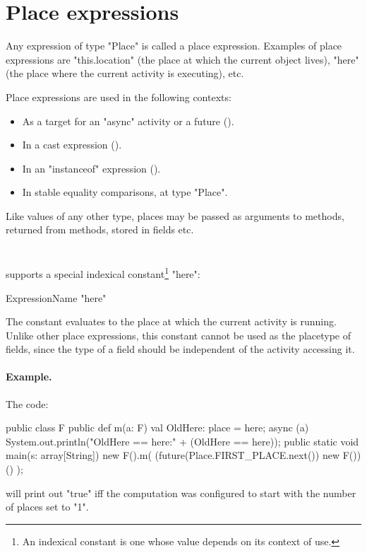 \section{Place expressions}
Any expression of type \xcd"Place" is called a place expression. 
Examples of place expressions are \xcd"this.location" (the place
at which the current object lives), \xcd"here"
(the place where the current activity is executing), etc.

Place expressions are used in the following contexts: 
\begin{itemize}
\item As a target for an \xcd"async" activity or a future
().
\item In a cast expression ().
\item In an \xcd"instanceof" expression ().
\item In stable equality comparisons, at type \xcd"Place".
\end{itemize}

Like values of any other type, places may be passed as arguments
to methods, returned from methods, stored in fields etc.

\section{}\label{Here}
\Xten{} supports a special indexical constant\footnote{
An indexical constant is one whose value depends on its context
of use.} \xcd"here":

\begin{grammar}
ExpressionName \: \xcd"here" \\
\end{grammar}

The constant evaluates to the place at which the current activity is
running. Unlike other place expressions, this constant cannot be 
used as the placetype of fields, since the type of a field 
should be independent of the activity accessing it.

\paragraph{Example.}
The code:
\begin{xten}
public class F {
  public def m(a: F) {
    val OldHere: place = here;
    async (a) {
      System.out.println("OldHere == here:" 
                         + (OldHere == here));
    }
  }
  public static void main(s: array[String]) {
    new F().m( (future(Place.FIRST_PLACE.next()) new F())() );
  }
}  
\end{xten}
\noindent will print out \xcd"true" iff the computation was configured
to start with the number of places set to \xcd"1". 


